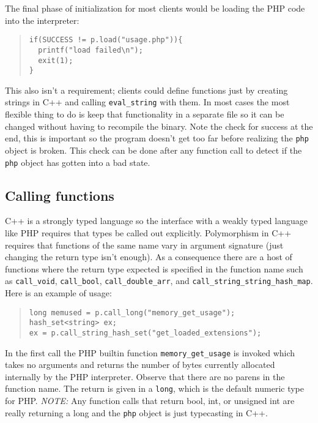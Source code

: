 \documentclass[11pt,titlepage]{article}
\begin{document}
The final phase of initialization for most clients would be loading the PHP code into the interpreter:

\begin{quote}
\begin{verbatim}
if(SUCCESS != p.load("usage.php")){
  printf("load failed\n");
  exit(1);
}
\end{verbatim}
\end{quote}

This also isn't a requirement; clients could define functions just by creating strings in C++ and calling \verb|eval_string| with them. In most cases the most flexible thing to do is keep that functionality in a separate file so it can be changed without having to recompile the binary. Note the check for success at the end, this is important so the program doesn't get too far before realizing the \verb|php| object is broken. This check can be done after any function call to detect if the \verb|php| object has gotten into a bad state.

\subsection{Calling functions}

C++ is a strongly typed language so the interface with a weakly typed language like PHP requires that types be called out explicitly. Polymorphism in C++ requires that functions of the same name vary in argument signature (just changing the return type isn't enough). As a consequence there are a host of functions where the return type expected is specified in the function name such as \verb|call_void|, \verb|call_bool|, \verb|call_double_arr|, and \verb|call_string_string_hash_map|. Here is an example of usage:

\begin{quote}
\begin{verbatim}
long memused = p.call_long("memory_get_usage");
hash_set<string> ex;
ex = p.call_string_hash_set("get_loaded_extensions");
\end{verbatim}
\end{quote}

In the first call the PHP builtin function \verb|memory_get_usage| is invoked which takes no arguments and returns the number of bytes currently allocated internally by the PHP interpreter. Observe that there are no parens in the function name. The return is given in a \verb|long|, which is the default numeric type for PHP. \emph{NOTE:} Any function calls that return bool, int, or unsigned int are really returning a long and the \verb|php| object is just typecasting in C++.
\end{document}
